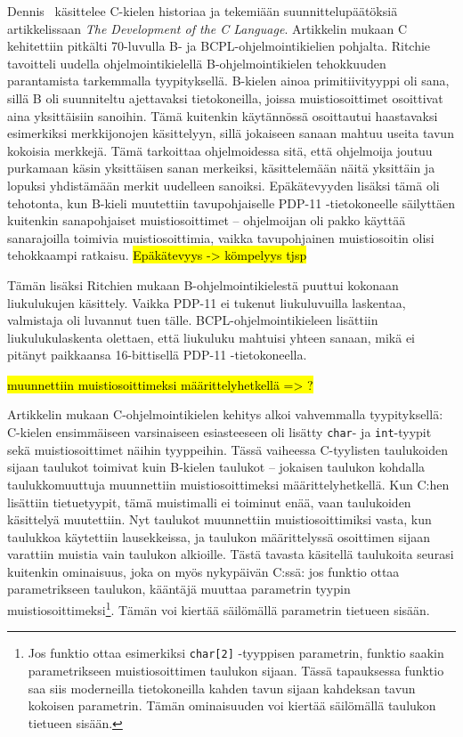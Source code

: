 Dennis~\citet{chistory} käsittelee C-kielen historiaa ja
tekemiään suunnittelupäätöksiä artikkelissaan \emph{The Development of the C
Language}. Artikkelin mukaan C kehitettiin pitkälti 70-luvulla B- ja
BCPL-ohjelmointikielien pohjalta. Ritchie tavoitteli uudella
ohjelmointikielellä B-ohjelmointikielen tehokkuuden parantamista tarkemmalla
tyypityksellä. B-kielen ainoa primitiivityyppi oli sana, sillä B oli suunniteltu ajettavaksi
tietokoneilla, joissa muistiosoittimet osoittivat aina yksittäisiin sanoihin.
Tämä kuitenkin käytännössä osoittautui haastavaksi esimerkiksi merkkijonojen
käsittelyyn, sillä jokaiseen sanaan mahtuu useita tavun kokoisia
merkkejä. Tämä tarkoittaa ohjelmoidessa sitä, että ohjelmoija joutuu purkamaan
käsin yksittäisen sanan merkeiksi, käsittelemään näitä yksittäin ja lopuksi
yhdistämään merkit uudelleen sanoiksi. Epäkätevyyden lisäksi tämä oli
tehotonta, kun B-kieli muutettiin tavupohjaiselle PDP-11 -tietokoneelle
säilyttäen kuitenkin sanapohjaiset muistiosoittimet -- ohjelmoijan oli pakko
käyttää sanarajoilla toimivia muistiosoittimia, vaikka tavupohjainen
muistiosoitin olisi tehokkaampi ratkaisu.
\hl{Epäkätevyys -> kömpelyys tjsp}

Tämän lisäksi Ritchien mukaan B-ohjelmointikielestä puuttui kokonaan
liukulukujen käsittely. Vaikka PDP-11 ei tukenut liukuluvuilla laskentaa,
valmistaja oli luvannut tuen tälle. BCPL-ohjelmointikieleen lisättiin
liukulukulaskenta olettaen, että liukuluku mahtuisi yhteen sanaan, mikä ei
pitänyt paikkaansa 16-bittisellä PDP-11 -tietokoneella.

\hl{muunnettiin muistiosoittimeksi määrittelyhetkellä => ?}

Artikkelin mukaan C-ohjelmointikielen kehitys alkoi vahvemmalla tyypityksellä:
C-kielen ensimmäiseen varsinaiseen esiasteeseen oli lisätty \texttt{char}- ja
\texttt{int}-tyypit sekä muistiosoittimet näihin tyyppeihin. Tässä vaiheessa
C-tyylisten taulukoiden sijaan taulukot toimivat kuin B-kielen taulukot --
jokaisen taulukon kohdalla taulukkomuuttuja muunnettiin muistiosoittimeksi
määrittelyhetkellä. Kun C:hen lisättiin tietuetyypit, tämä muistimalli ei
toiminut enää, vaan taulukoiden käsittelyä muutettiin. Nyt taulukot muunnettiin
muistiosoittimiksi vasta, kun taulukkoa käytettiin lausekkeissa, ja taulukon
määrittelyssä osoittimen sijaan varattiin muistia vain taulukon alkioille.
Tästä tavasta käsitellä taulukoita seurasi kuitenkin ominaisuus, joka on myös
nykypäivän C:ssä: jos funktio ottaa parametrikseen taulukon, kääntäjä muuttaa
parametrin tyypin muistiosoittimeksi\footnote{Jos funktio ottaa esimerkiksi
\texttt{char[2]} -tyyppisen parametrin, funktio saakin parametrikseen
muistiosoittimen taulukon sijaan. Tässä tapauksessa funktio saa siis
moderneilla tietokoneilla kahden tavun sijaan kahdeksan tavun kokoisen
parametrin. Tämän ominaisuuden voi kiertää säilömällä taulukon tietueen
sisään.}. Tämän voi kiertää säilömällä parametrin tietueen sisään.


